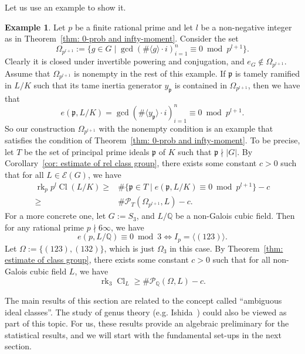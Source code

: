 \documentclass{amsart}
\numberwithin{equation}{section}
\theoremstyle{plain}
\theoremstyle{definition}
\newtheorem{example}[theorem]{Example}
\theoremstyle{remark}
\begin{document}
Let us use an example to show it.
\begin{example}
	Let $p$ be a finite rational prime and let $l$ be a non-negative integer as in Theorem~\ref{thm: 0-prob and infty-moment}.
	Consider the set
	\begin{equation*}
		\Omega_{p^{l+1}}:=\{g\in G\mid\gcd(\#\langle g\rangle\cdot i)_{i=1}^n\equiv0\bmod{p^{l+1}}\}.
	\end{equation*}
	Clearly it is closed under invertible powering and conjugation, and $e_G\notin\Omega_{p^{l+1}}$.
	Assume that $\Omega_{p^{l+1}}$ is nonempty in the rest of this example.
	If $\mathfrak{p}$ is tamely ramified in $L/K$ such that its tame inertia generator $y_{\mathfrak{p}}$ is contained in $\Omega_{p^{l+1}}$, then we have that
	\begin{equation*}
		e(\mathfrak{p},L/K)=\gcd(\#\langle y_{\mathfrak{p}}\rangle\cdot i)_{i=1}^n\equiv0\bmod{p^{l+1}}.
	\end{equation*}
	So our construction $\Omega_{p^{l+1}}$ with the nonempty condition is an example that satisfies the condition of Theorem~\ref{thm: 0-prob and infty-moment}.
	To be precise, let $T$ be the set of principal prime ideals $\mathfrak{p}$ of $K$ such that $\mathfrak{p}\nmid\lvert G\rvert$.
	By Corollary~\ref{cor: estimate of rel class group}, there exists some constant $c>0$ such that for all $L\in\mathcal{E}(G)$, we have
	\begin{equation*}
		\begin{aligned}
			\operatorname{rk}_p p^l\operatorname{Cl}(L/K)
			\geq&\#\{\mathfrak{p}\in T\mid e(\mathfrak{p},L/K)\equiv0\bmod{p^{l+1}}\}-c
			\\
			\geq&\#\mathcal{P}_{T}(\Omega_{p^{l+1}},L)-c.
		\end{aligned}		
	\end{equation*}	
	For a more concrete one, let $G:=S_3$, and $L/\mathbb{Q}$ be a non-Galois cubic field.
	Then for any rational prime $p\nmid6\infty$, we have
	\begin{equation*}
		e(p,L/\mathbb{Q})\equiv0\bmod{3}\iff I_p=\langle(123)\rangle.
	\end{equation*}
	Let $\Omega:=\{(123),(132)\}$, which is just $\Omega_3$ in this case.
	By Theorem~\ref{thm: estimate of class group}, there exists some constant $c>0$ such that for all non-Galois cubic field $L$, we have
	\begin{equation*}
		\operatorname{rk}_3\operatorname{Cl}_L\geq\#\mathcal{P}_{\mathbb{Q}}(\Omega,L)-c.
	\end{equation*}
\end{example}
The main results of this section are related to the concept called ``ambiguous ideal classes''.
The study of genus theory (e.g. Ishida~\cite{ishida1976genus}) could also be viewed as part of this topic.
For us, these results provide an algebraic preliminary for the statistical results, and we will start with the fundamental set-ups in the next section.
\end{document}
